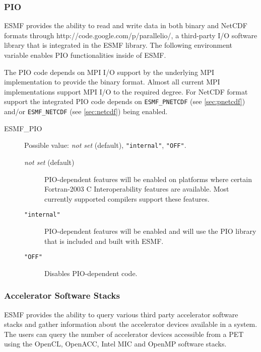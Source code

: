 \subsubsection{PIO}
\label{sec:pio}
ESMF provides the ability to read and write data in both binary and 
NetCDF formats through 
{http://code.google.com/p/parallelio/}, a third-party I/O software
library that is integrated in the ESMF library. The following environment
variable enables PIO functionalities inside of ESMF.

The PIO code depends on MPI I/O support by the underlying MPI
implementation to provide the binary format. Almost all current MPI
implementations support MPI I/O to the required degree. For NetCDF format
support the integrated PIO code depends on {\tt ESMF\_PNETCDF}
(see \ref{sec:pnetcdf}) and/or {\tt ESMF\_NETCDF} (see \ref{sec:netcdf})
being enabled.

\begin{description}
\item[ESMF\_PIO] Possible value: {\it not set} (default), {\tt "internal"},
{\tt "OFF"}.

\begin{description}
\item[{\it not set} (default)] PIO-dependent features will be enabled on platforms where
certain Fortran-2003 C Interoperability features are available.  Most currently supported
compilers support these features.

\item[{\tt "internal"}] PIO-dependent features will be enabled and will use the 
PIO library that is included and built with ESMF.  

\item[{\tt "OFF"}] Disables PIO-dependent code.

\end{description}

\end{description}

\subsubsection{Accelerator Software Stacks}
\label{sec:acc}
ESMF provides the ability to query various third party accelerator software
stacks and gather information about the accelerator devices available in a
system. The users can query the number of accelerator devices accessible
from a PET using the OpenCL, OpenACC, Intel MIC and OpenMP software stacks.

